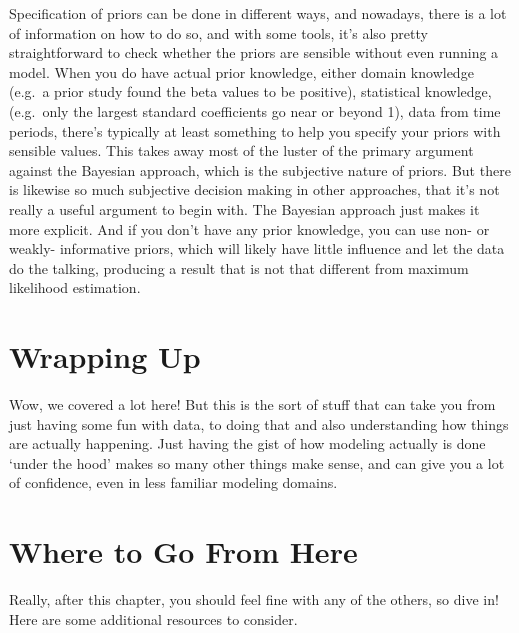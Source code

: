 \documentclass[
  letterpaper,
]{krantz}
\begin{document}
\begin{tcolorbox}[enhanced jigsaw, opacityback=0, leftrule=.75mm, bottomrule=.15mm, colframe=quarto-callout-tip-color-frame, rightrule=.15mm, breakable, left=2mm, colback=white, arc=.35mm, toprule=.15mm]

Specification of priors can be done in different ways, and nowadays,
there is a lot of information on how to do so, and with some tools, it's
also pretty straightforward to check whether the priors are sensible
without even running a model. When you do have actual prior knowledge,
either domain knowledge (e.g.~a prior study found the beta values to be
positive), statistical knowledge, (e.g.~only the largest standard
coefficients go near or beyond 1), data from time periods, there's
typically at least something to help you specify your priors with
sensible values. This takes away most of the luster of the primary
argument against the Bayesian approach, which is the subjective nature
of priors. But there is likewise so much subjective decision making in
other approaches, that it's not really a useful argument to begin with.
The Bayesian approach just makes it more explicit. And if you don't have
any prior knowledge, you can use non- or weakly- informative priors,
which will likely have little influence and let the data do the talking,
producing a result that is not that different from maximum likelihood
estimation.

\end{tcolorbox}

\section{Wrapping Up}\label{sec-estim-wrap}

Wow, we covered a lot here! But this is the sort of stuff that can take
you from just having some fun with data, to doing that and also
understanding how things are actually happening. Just having the gist of
how modeling actually is done `under the hood' makes so many other
things make sense, and can give you a lot of confidence, even in less
familiar modeling domains.

\section{Where to Go From Here}\label{sec-estim-where-to-go}

Really, after this chapter, you should feel fine with any of the others,
so dive in! Here are some additional resources to consider.
\end{document}

